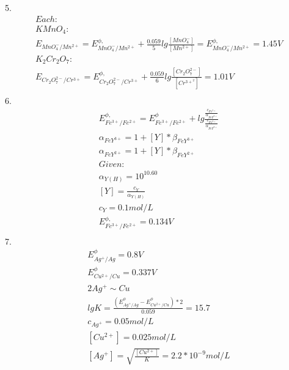 \documentclass{article}
\begin{document}
5.\begin{equation}
    \begin{multlined}
    Each:\\
        KMnO_4:\\
        E_{MnO_4^-/Mn^{2+}} = E^{\phi,}_{MnO_4^-/Mn^{2+}} + \frac{0.059}{5}lg\frac{[MnO_4^-]}{[Mn^{2+}]} = E^{\phi,}_{MnO_4^-/Mn^{2+}} = 1.45 V\\
        K_2Cr_2O_7:\\
        E_{Cr_2O_7^{2-}/Cr^{3+}} = E^{\phi,}_{Cr_2O_7^{2-}/Cr^{3+}} + \frac{0.059}{6}lg\frac{[Cr_2O_7^{2-}]}{[Cr^{3+}^2]} = 1.01 V\\
    \end{multlined}
\end{equation}
6.\begin{equation}
    \begin{multlined}
        E^{\phi,}_{Fe^{3+}/Fe^{2+}} = E^{\phi}_{Fe^{3+}/Fe^{2+}} + lg\frac{\frac{c_{Fe^{3+}}}{\alpha_{FeY^{3+}}}}{\frac{c_{Fe^{2+}}}{\alpha_{FeY^{2+}}}}\\
        \alpha_{FeY^{3+}} = 1 + [Y]*\beta_{FeY^{3+}}\\
        \alpha_{FeY^{2+}} = 1 + [Y]*\beta_{FeY^{2+}}\\
        Given:\\
        \alpha_{Y(H)} = 10^{10.60}\\
        [Y] = \frac{c_Y}{\alpha_{Y(H)}}\\
        c_Y = 0.1 mol/L\\
        E^{\phi,}_{Fe^{3+}/Fe^{2+}} = 0.134V\\
    \end{multlined}
\end{equation}
7.\begin{equation}
    \begin{multlined}
        E^{\phi}_{Ag^+/Ag} = 0.8V\\
        E^{\phi}_{Cu^{2+}/Cu} = 0.337V\\
        2Ag^+ \sim Cu\\
        lgK = \frac{(E^{\phi}_{Ag^+/Ag} - E^{\phi}_{Cu^{2+}/Cu})*2}{0.059} = 15.7\\
        c_{Ag^+} = 0.05 mol/L\\
        [Cu^{2+}] = 0.025 mol/L\\
        [Ag^+] = \sqrt{\frac{[Cu^{2+}]}{K}} = 2.2*10^{-9} mol/L\\
    \end{multlined}
\end{equation}
\end{document}
